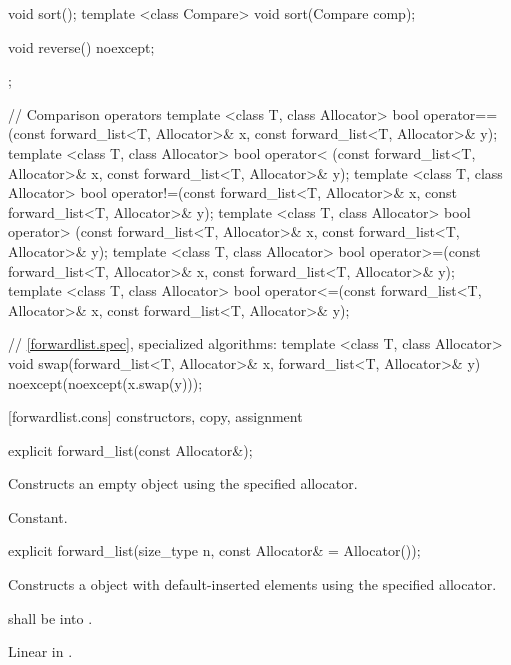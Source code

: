 \begin{codeblock}
{{    void sort();
    template <class Compare> void sort(Compare comp);

    void reverse() noexcept;
  };

  // Comparison operators
  template <class T, class Allocator>
    bool operator==(const forward_list<T, Allocator>& x, const forward_list<T, Allocator>& y);
  template <class T, class Allocator>
    bool operator< (const forward_list<T, Allocator>& x, const forward_list<T, Allocator>& y);
  template <class T, class Allocator>
    bool operator!=(const forward_list<T, Allocator>& x, const forward_list<T, Allocator>& y);
  template <class T, class Allocator>
    bool operator> (const forward_list<T, Allocator>& x, const forward_list<T, Allocator>& y);
  template <class T, class Allocator>
    bool operator>=(const forward_list<T, Allocator>& x, const forward_list<T, Allocator>& y);
  template <class T, class Allocator>
    bool operator<=(const forward_list<T, Allocator>& x, const forward_list<T, Allocator>& y);

  // \ref{forwardlist.spec}, specialized algorithms:
  template <class T, class Allocator>
    void swap(forward_list<T, Allocator>& x, forward_list<T, Allocator>& y)
      noexcept(noexcept(x.swap(y)));
}
\end{codeblock}

[forwardlist.cons]{ constructors, copy, assignment}

%
%
\begin{itemdecl}
explicit forward_list(const Allocator&);
\end{itemdecl}

\begin{itemdescr}
\pnum
\effects Constructs an empty  object using the specified allocator.

\pnum
\complexity Constant.
\end{itemdescr}

%
%
\begin{itemdecl}
explicit forward_list(size_type n, const Allocator& = Allocator());
\end{itemdecl}

\begin{itemdescr}
\pnum
\effects Constructs a  object with 
default-inserted elements using the specified allocator.

\pnum
\requires {} shall be  into .

\pnum
\complexity Linear in .
\end{itemdescr}


